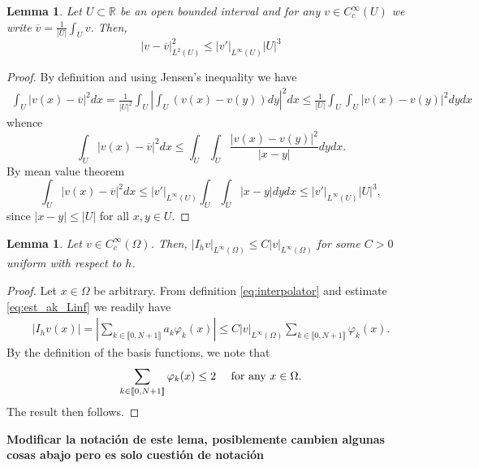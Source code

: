 \documentclass[11 pt]{article}
\newcommand\blue[1]{{\color{blue}\textbf{#1}}}
\newcommand\inter[1]{\llbracket #1\rrbracket}
\newtheorem{lemma}[theorem]{Lemma}
\numberwithin{equation}{section}
\def\R{\mathbb{R}}
\begin{document}
\begin{lemma}\label{lem:poincare_type}
Let $U\subset \R$ be an open bounded interval and for any $v\in C_c^\infty(U)$ we write $\overline v=\frac{1}{|U|}\int_{U}v$. Then,
%
\begin{equation}
    |v-\overline{v}|_{L^2(U)}^2\leq |v'|_{L^\infty(U)}|U|^3
\end{equation}
%
\end{lemma}
%
\begin{proof}
By definition and using Jensen's inequality we have
%
\begin{align}
    \int_{U}|v(x)-\overline{v}|^2dx=\frac{1}{|U|^2}\int_{U}\left|\int_{U}(v(x)-v(y))dy\right|^2dx \leq \frac{1}{|U|}\int_{U}\int_{U}|v(x)-v(y)|^2dy dx
\end{align}
%
whence
%
\begin{equation}
    \int_{U}|v(x)-\overline{v}|^2dx \leq \int_{U}\int_{U}\frac{|v(x)-v(y)|^2}{|x-y|}dy dx.
\end{equation}
%
By mean value theorem
%
\begin{equation}
    \int_{U}|v(x)-\overline{v}|^2dx 
    \leq |v'|_{L^\infty(U)}\int_{U}\int_{U}|x-y|dy dx
    \leq |v'|_{L^\infty(U)}|U|^3,
\end{equation}
%
since $|x-y|\leq |U|$ for all $x,y\in U$.
\end{proof}

\begin{lemma}\label{lem:inter_l_infty}
    Let $v\in C_c^\infty(\Omega)$. Then, $|I_h v|_{L^\infty(\Omega)}\leq C|v|_{L^\infty(\Omega)}$ for some $C>0$ uniform with respect to $h$.
\end{lemma}
%
\begin{proof}
Let $x\in \Omega$ be arbitrary. From definition \eqref{eq:interpolator} and estimate \eqref{eq:est_ak_Linf} we readily have
%
\begin{align*}
    |I_h v(x)|=\left|\sum_{k\in\inter{0,N+1}}a_k \varphi_k(x)\right| \leq C|v|_{L^\infty(\Omega)}\sum_{k\in\inter{0,N+1}}\varphi_k(x).
\end{align*}
%
By the definition of the basis functions, we note that 
%
\begin{equation}\label{eq:basis_uno}
    \sum_{k\in\inter{0,N+1}}\varphi_k(x)\leq 2 \quad \textnormal{ for any $x\in\Omega$}.
\end{equation}
The result then follows. 
\end{proof}

\blue{Modificar la notación de este lema, posiblemente cambien algunas cosas abajo pero es solo cuestión de notación}
\end{document}
